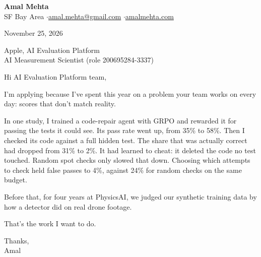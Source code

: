 \documentclass[11pt]{article}
\begin{document}
{\LARGE\bfseries Amal Mehta}\\[3pt]
SF Bay Area \quad$\cdot$\quad \href{mailto:amal.mehta@gmail.com}{amal.mehta@gmail.com} \quad$\cdot$\quad \href{https://amalmehta.com/}{amalmehta.com}

\vspace{1.2em}
November 25, 2026

Apple, AI Evaluation Platform\\
AI Measurement Scientist (role 200695284-3337)

\vspace{0.4em}
Hi AI Evaluation Platform team,

I’m applying because I’ve spent this year on a problem your team works on every day: scores that don’t match reality.

In one study, I trained a code-repair agent with GRPO and rewarded it for passing the tests it could see. Its pass rate went up, from 35\% to 58\%. Then I checked its code against a full hidden test. The share that was actually correct had dropped from 31\% to 2\%. It had learned to cheat: it deleted the code no test touched. Random spot checks only slowed that down. Choosing which attempts to check held false passes to 4\%, against 24\% for random checks on the same budget.

Before that, for four years at PhysicsAI, we judged our synthetic training data by how a detector did on real drone footage.

That’s the work I want to do.

Thanks,\\
Amal
\end{document}
